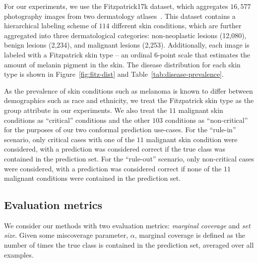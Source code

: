 \documentclass[letterpaper]{article} %
\begin{document}
        For our experiments, we use the Fitzpatrick17k dataset, which aggregates $16,577$ photography images from two dermatology atlases~\cite{Groh2021EvaluatingDN}.
        This dataset contains a hierarchical labeling scheme of $114$ different skin conditions, which are further aggregated into three dermatological categories: non-neoplastic lesions (12,080), benign lesions (2,234), and malignant lesions (2,253).
        Additionally, each image is labeled with a Fitzpatrick skin type -- an ordinal 6-point scale that estimates the amount of melanin pigment in the skin.
        The disease distribution for each skin type is shown in Figure~\ref{fig:fitz-dist} and Table~\ref{tab:disease-prevalence}.

        As the prevalence of skin conditions such as melanoma is known to differ between demographics such as race and ethnicity, we treat the Fitzpatrick skin type as the group attribute in our experiments.
        We also treat the $11$ malignant skin conditions as ``critical'' conditions and the other $103$ conditions as ``non-critical'' for the purposes of our two conformal prediction use-cases.
        For the ``rule-in'' scenario, only critical cases with one of the $11$ malignant skin condition were considered, with a prediction was considered correct if the true class was contained in the prediction set.
        For the ``rule-out'' scenario, only non-critical cases were considered, with a prediction was considered correct if none of the $11$ malignant conditions were contained in the prediction set.

    \subsection{Evaluation metrics}
        We consider our methods with two evaluation metrics: \textit{marginal coverage} and \textit{set size}.
        Given some miscoverage parameter, $\alpha$, marginal coverage is defined as the number of times the true class is contained in the prediction set, averaged over all examples.
\end{document}
